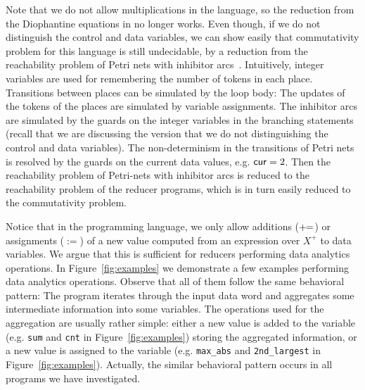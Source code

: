Note that we do not allow multiplications in the language, so the reduction from the Diophantine equations in \cite{CHSW15} no longer works. Even though, if we do not distinguish the control and data variables, we can show easily that commutativity problem for this language is still undecidable, by a reduction from the reachability problem of Petri nets with inhibitor arcs~\cite{Min71,Rei08}.
Intuitively, integer variables are used for remembering the number of tokens in each place. Transitions between places can be simulated by the loop body: The updates of the tokens of the places are simulated by variable assignments.
The inhibitor arcs are simulated by the guards on the integer variables in the branching statements (recall that we are discussing the version that we do not distinguishing the control and data variables). The non-determinism in the transitions of Petri nets is resolved by the guards on the current data values, e.g. $\mathsf{cur} = 2$. 
Then the reachability problem of Petri-nets with inhibitor arcs is reduced to the reachability problem of the reducer programs, which is in turn easily reduced to the commutativity problem.

Notice that in the programming language, we only allow additions ($+\!\!=$) or assignments ($:=$) of a new value computed from an expression over $X^+$ to data variables. 
We argue that this is sufficient for reducers performing data analytics operations.
In Figure~\ref{fig:examples} we demonstrate a few examples performing data analytics operations. Observe that all of them follow the same behavioral pattern: The program iterates through the input data word and aggregates some intermediate information into some variables. The operations used for the aggregation are usually rather simple: either a new value is added to the variable (e.g. \texttt{sum} and \texttt{cnt} in Figure~\ref{fig:examples}) storing the aggregated information, or a new value is assigned to the variable (e.g. \texttt{max\_abs} and \texttt{2nd\_largest} in Figure~\ref{fig:examples}). Actually, the similar behavioral pattern occurs in all programs we have investigated.




 


